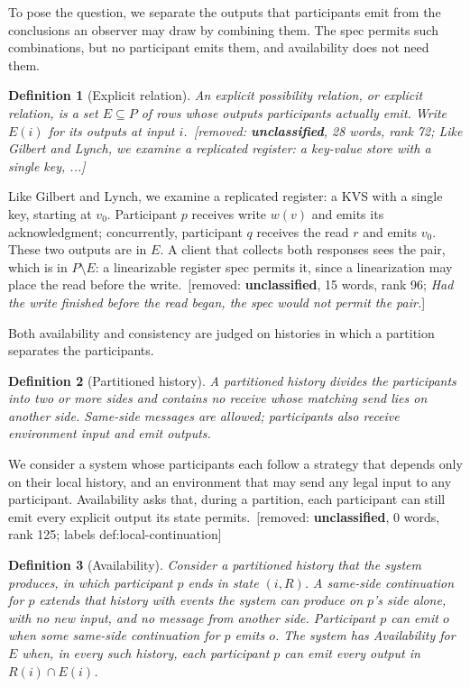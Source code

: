 \documentclass[sigconf]{cidr-2027}
\newtheorem{definition}{Definition}
\theoremstyle{remark}
\newcommand{\removednote}[1]{{\color{cutred}\footnotesize\,[removed: #1]\,}}
\begin{document}
\textcolor{newblue}{To pose the question, we separate the outputs that participants emit from
the conclusions an observer may draw by combining them.} The spec permits such combinations, but no participant emits them, and availability does not
need them.

\begin{definition}[Explicit relation]
\label{def:explicit-relation}
An \emph{explicit possibility relation}, or \emph{explicit relation}, is a set
$E\subseteq P$ of rows whose outputs participants actually emit. Write $E(i)$
for its outputs at input $i$. \removednote{\textbf{unclassified}, 28 words, rank 72; \textit{Like Gilbert and Lynch, we examine a replicated register: a key-value store with a single key, ...}}
\end{definition}

\textcolor{newblue}{Like Gilbert and Lynch, we examine a replicated register: a KVS
with a single key, starting at $v_0$.} Participant $p$ receives write $w(v)$
and emits its acknowledgment; concurrently, participant $q$ receives the read
$r$ and emits $v_0$. These two outputs are in $E$. \textcolor{newblue}{A client that collects
both responses sees the pair, which is in $P\setminus E$: a linearizable
register spec permits it, since a linearization may place the read before the
write.} \removednote{\textbf{unclassified}, 15 words, rank 96; \textit{Had the write finished before the read began, the spec would not permit the pair.}}

Both availability and consistency are judged on histories in which a partition
separates the participants.

\begin{definition}[Partitioned history]
\label{def:partitioned-history}
A \emph{partitioned history} divides the participants into two or more
sides and contains no receive whose matching send lies on another side. \textcolor{newblue}{Same-side messages are allowed; participants also receive environment
input and emit outputs.}
\end{definition}

We consider a system whose participants each follow a strategy that depends
only on their local history, and an environment that may send any legal input
to any participant. Availability asks that, during a partition, each
participant can still emit every explicit output its state permits. \removednote{\textbf{unclassified}, 0 words, rank 125; labels def:local-continuation}

\begin{definition}[Availability]
\label{def:partition-notions}
Consider a partitioned history that the system produces, in which participant
$p$ ends in state $(i,R)$. \textcolor{newblue}{A \emph{same-side continuation} for $p$ extends that
history with events the system can produce on $p$'s side alone, with no new
input, and no message from another side.} Participant $p$ can emit $o$ when some same-side continuation for $p$ emits
$o$. \textcolor{newblue}{The system has \emph{Availability for $E$} when, in every
such history, each participant $p$ can emit every output in $R(i)\cap E(i)$.}
\end{definition}
\end{document}
